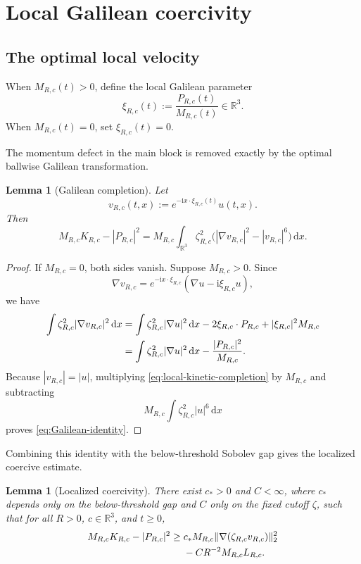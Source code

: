 \documentclass{interact}
\numberwithin{equation}{section}
\theoremstyle{plain}
\newtheorem{lemma}[theorem]{Lemma}
\theoremstyle{definition}
\theoremstyle{remark}
\newcommand{\R}{\mathbb R}
\newcommand{\ii}{\mathrm i}
\newcommand{\dd}{\,\mathrm d}
\begin{document}
\section{Local Galilean coercivity}

\subsection{The optimal local velocity}

When $M_{R,c}(t)>0$, define the local Galilean parameter
\[
 \xi_{R,c}(t):=\frac{P_{R,c}(t)}{M_{R,c}(t)}\in\R^3.
\]
When $M_{R,c}(t)=0$, set $\xi_{R,c}(t)=0$.

The momentum defect in the main block is removed exactly by the optimal ballwise Galilean transformation.

\begin{lemma}[Galilean completion]\label{lem:Galilean-completion}
Let
\[
 v_{R,c}(t,x):=e^{-\ii x\cdot\xi_{R,c}(t)}u(t,x).
\]
Then
\begin{equation}\label{eq:Galilean-identity}
 M_{R,c}K_{R,c}-|P_{R,c}|^2
 =M_{R,c}\int_{\R^3}\zeta_{R,c}^2
 \bigl(|\nabla v_{R,c}|^2-|v_{R,c}|^6\bigr)\dd x.
\end{equation}
\end{lemma}

\begin{proof}
If $M_{R,c}=0$, both sides vanish. Suppose $M_{R,c}>0$. Since
\[
 \nabla v_{R,c}
 =e^{-\ii x\cdot\xi_{R,c}}(\nabla u-\ii\xi_{R,c}u),
\]
we have
\begin{align}
 \int\zeta_{R,c}^2|\nabla v_{R,c}|^2\dd x
 &=\int\zeta_{R,c}^2|\nabla u|^2\dd x
 -2\xi_{R,c}\cdot P_{R,c}
 +|\xi_{R,c}|^2M_{R,c}
 \notag\\
 &=\int\zeta_{R,c}^2|\nabla u|^2\dd x
 -\frac{|P_{R,c}|^2}{M_{R,c}}.
 \label{eq:local-kinetic-completion}
\end{align}
Because $|v_{R,c}|=|u|$, multiplying \eqref{eq:local-kinetic-completion} by $M_{R,c}$ and subtracting
\[
 M_{R,c}\int\zeta_{R,c}^2|u|^6\dd x
\]
proves \eqref{eq:Galilean-identity}.
\end{proof}

Combining this identity with the below-threshold Sobolev gap gives the localized coercive estimate.

\begin{lemma}[Localized coercivity]\label{lem:local-coercivity}
There exist $c_*>0$ and $C<\infty$, where $c_*$ depends only on the below-threshold gap and $C$ only on the fixed cutoff $\zeta$, such that for all $R>0$, $c\in\R^3$, and $t\ge0$,
\begin{align}
 M_{R,c}K_{R,c}-|P_{R,c}|^2
 \ge{}&c_*M_{R,c}
 \|\nabla(\zeta_{R,c}v_{R,c})\|_2^2
 \notag\\
 &-CR^{-2}M_{R,c}L_{R,c}.
 \label{eq:local-coercivity}
\end{align}
\end{lemma}
\end{document}
